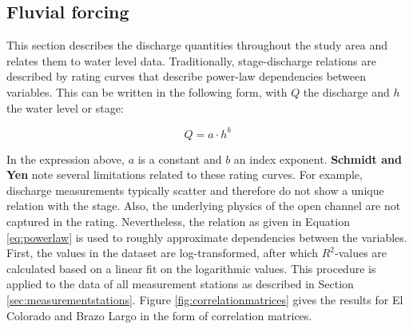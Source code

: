 \subsection{Fluvial forcing}
This section describes the discharge quantities throughout the study area and relates them to water level data. Traditionally, stage-discharge relations are described by rating curves that describe power-law dependencies between variables. This can be written in the following form, with $Q$ the discharge and $h$ the water level or stage:

\begin{equation}
\label{eq:powerlaw}
    Q = a \cdot h^b
\end{equation}

In the expression above, $a$ is a constant and $b$ an index exponent. \textbf{Schmidt and Yen} note several limitations related to these rating curves. For example, discharge measurements typically scatter and therefore do not show a unique relation with the stage. Also, the underlying physics of the open channel are not captured in the rating. Nevertheless, the relation as given in Equation \ref{eq:powerlaw} is used to roughly approximate dependencies between the variables. First, the values in the dataset are log-transformed, after which $R^2$-values are calculated based on a linear fit on the logarithmic values. This procedure is applied to the data of all measurement stations as described in Section \ref{sec:measurementstations}. Figure \ref{fig:correlationmatrices} gives the results for El Colorado and Brazo Largo in the form of correlation matrices. 

